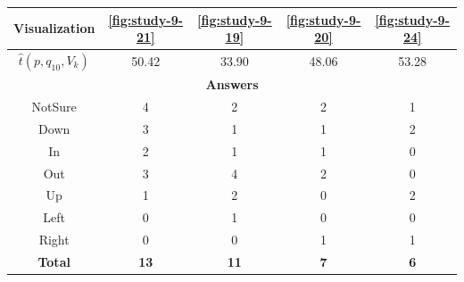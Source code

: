 \begin{center}
\begin{tabular}{| c | c | c | c | c |}
	\hline
	Visualization & \ref{fig:study-9-21} & \ref{fig:study-9-19} & \ref{fig:study-9-20} & \ref{fig:study-9-24}\\ \hline
	\(\widehat{t}(p, q_10, V_k)\) & 50.42 & 33.90 & 48.06 & 53.28\\ \hline
	\multicolumn{5}{|c|}{\bf Answers} \\ \hline
	NotSure & 4 & 2 & 2 & 1\\ \hline
	\rowcolor{yellow!30} Down & 3 & 1 & 1 & 2\\ \hline
	In & 2 & 1 & 1 & 0\\ \hline
	Out & 3 & 4 & 2 & 0\\ \hline
	Up & 1 & 2 & 0 & 2\\ \hline
	Left & 0 & 1 & 0 & 0\\ \hline
	Right & 0 & 0 & 1 & 1\\ \hline
	{\bf Total} & {\bf 13} & {\bf 11} & {\bf 7} & {\bf 6}\\ \hline
\end{tabular}
\end{center}
\clearpage

